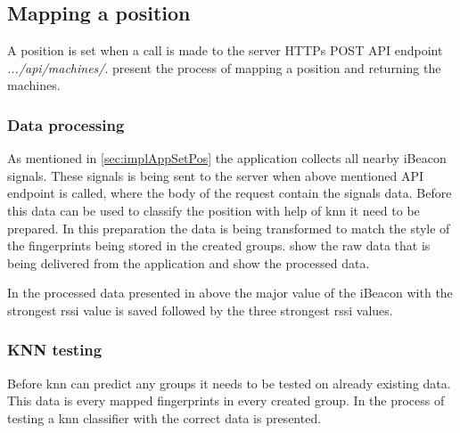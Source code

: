 \subsection{Mapping a position}\label{sec:implServerSetPos}
A position is set when a call is made to the server HTTPs POST API endpoint \textit{.../api/machines/}.
 present the process of mapping a position and returning the machines.


\subsubsection{Data processing}\label{sec:implServerSetPosDataProcessing}
As mentioned in \cref{sec:implAppSetPos} the application collects all nearby iBeacon signals.
These signals is being sent to the server when above mentioned API endpoint is called, where the body of the request contain the signals data.
Before this data can be used to classify the position with help of \acrfull{knn} it need to be prepared.
In this preparation the data is being transformed to match the style of the fingerprints being stored in the created groups.
 show the raw data that is being delivered from the application and  show the processed data.



In the processed data presented in  above the major value of the iBeacon with the strongest \acrshort{rssi} value is saved followed by the three strongest \acrshort{rssi} values.


\subsubsection{KNN testing}\label{sec:implServerSetPosKnnTesting}

Before \acrshort{knn} can predict any groups it needs to be tested on already existing data.
This data is every mapped fingerprints in every created group.
In  the process of testing a \acrshort{knn} classifier with the correct data is presented.

